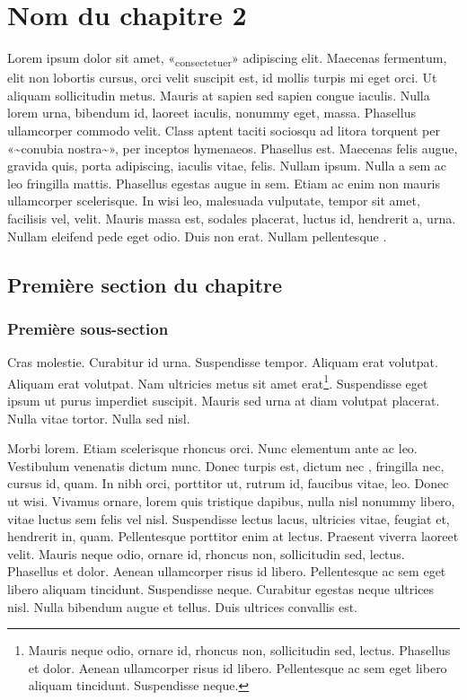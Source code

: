 \hypertarget{nom-du-chapitre-2}{%
\chapter{Nom du chapitre 2}\label{nom-du-chapitre-2}}

Lorem ipsum dolor sit amet, «\textsubscript{consectetuer}» adipiscing
elit. Maecenas fermentum, elit non lobortis cursus, orci velit suscipit
est, id mollis turpis mi eget orci. Ut aliquam sollicitudin metus.
Mauris at sapien sed sapien congue iaculis. Nulla lorem urna, bibendum
id, laoreet iaculis, nonummy eget, massa. Phasellus ullamcorper commodo
velit. Class aptent taciti sociosqu ad litora torquent per
«\textasciitilde conubia nostra\textasciitilde», per inceptos hymenaeos.
Phasellus est. Maecenas felis augue, gravida quis, porta adipiscing,
iaculis vitae, felis. Nullam ipsum. Nulla a sem ac leo fringilla mattis.
Phasellus egestas augue in sem. Etiam ac enim non mauris ullamcorper
scelerisque. In wisi leo, malesuada vulputate, tempor sit amet,
facilisis vel, velit. Mauris massa est, sodales placerat, luctus id,
hendrerit a, urna. Nullam eleifend pede eget odio. Duis non erat. Nullam
pellentesque \autocite{Doule1887}.

\hypertarget{premiuxe8re-section-du-chapitre}{%
\section{Première section du
chapitre}\label{premiuxe8re-section-du-chapitre}}

\hypertarget{premiuxe8re-sous-section}{%
\subsection{Première sous-section}\label{premiuxe8re-sous-section}}

Cras molestie. Curabitur id urna. Suspendisse tempor. Aliquam erat
volutpat. Aliquam erat volutpat. Nam ultricies metus sit amet
erat\footnote{Mauris neque odio, ornare id, rhoncus non, sollicitudin sed, lectus. Phasellus et dolor. Aenean ullamcorper risus id libero. Pellentesque ac sem eget libero aliquam tincidunt. Suspendisse neque.}.
Suspendisse eget ipsum ut purus imperdiet suscipit. Mauris sed urna at
diam volutpat placerat. Nulla vitae tortor. Nulla sed nisl.

Morbi lorem. Etiam scelerisque rhoncus orci. Nunc elementum ante ac leo.
Vestibulum venenatis dictum nunc. Donec turpis est, dictum nec
\autocite{Drocher2006}, fringilla nec, cursus id, quam. In nibh orci,
porttitor ut, rutrum id, faucibus vitae, leo. Donec ut wisi. Vivamus
ornare, lorem quis tristique dapibus, nulla nisl nonummy libero, vitae
luctus sem felis vel nisl. Suspendisse lectus lacus, ultricies vitae,
feugiat et, hendrerit in, quam. Pellentesque porttitor enim at lectus.
Praesent viverra laoreet velit. Mauris neque odio, ornare id, rhoncus
non, sollicitudin sed, lectus. Phasellus et dolor. Aenean ullamcorper
risus id libero. Pellentesque ac sem eget libero aliquam tincidunt.
Suspendisse neque. Curabitur egestas neque ultrices nisl. Nulla bibendum
augue et tellus. Duis ultrices convallis est.

